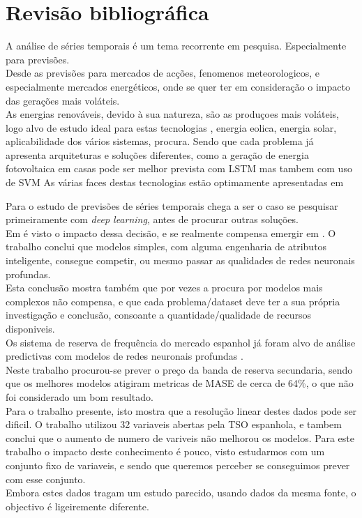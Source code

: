 \chapter{Revisão bibliográfica}

A análise de séries temporais é um tema recorrente em pesquisa. Especialmente para previsões.\\
Desde as previsões para mercados de acções\cite{Bhandari2022}, fenomenos meteorologicos\cite{Wang2019}, e especialmente mercados energéticos, onde se quer ter em consideração o impacto das gerações mais voláteis. \\
As energias renováveis, devido à sua natureza, são as produçoes mais voláteis, logo alvo de estudo ideal para estas tecnologias\cite{Lu2015}
, energia eolica\cite{Sun2022}, energia solar\cite{Rajasundrapandiyanleebanon2023}, aplicabilidade dos vários sistemas\cite{Ahmad2020}, procura\cite{Antonopoulos2020}.
Sendo que cada problema já apresenta arquiteturas e soluções diferentes, como a geração de energia fotovoltaica em casas pode ser melhor prevista com LSTM\cite{Costa2022} mas tambem com uso de SVM\cite{Meenal2018}
As várias faces destas tecnologias estão optimamente apresentadas em\cite{Benti2023}



Para o estudo de previsões de séries temporais chega a ser o caso se pesquisar primeiramente com \textit{deep learning}, antes de procurar outras soluções.\\
Em \cite{Elsayed} é visto o impacto dessa decisão, e se realmente compensa emergir em . O trabalho conclui que modelos simples, com alguma engenharia de atributos inteligente, consegue competir, ou mesmo passar as qualidades de redes neuronais profundas. \\
Esta conclusão mostra também que por vezes a procura por modelos mais complexos não compensa, e que cada problema/dataset deve ter a sua própria investigação e conclusão, consoante a quantidade/qualidade de recursos disponiveis. \\

Os sistema de reserva de frequência do mercado espanhol já foram alvo de análise predictivas com modelos de redes neuronais profundas \cite{miota2023}.\\
Neste trabalho procurou-se prever o preço da banda de reserva secundaria, sendo que os melhores modelos atigiram metricas de MASE de cerca de 64\%, o que não foi considerado um bom resultado. \\
Para o trabalho presente, isto mostra que a resolução linear destes dados pode ser dificil. O trabalho utilizou 32 variaveis abertas pela TSO espanhola, e tambem conclui que o aumento de numero de variveis não melhorou os modelos. Para este trabalho o impacto deste conhecimento é pouco, visto estudarmos com um conjunto fixo de variaveis, e sendo que queremos perceber se conseguimos prever com esse conjunto.\\
Embora estes dados tragam um estudo parecido, usando dados da mesma fonte, o objectivo é ligeiremente diferente.







